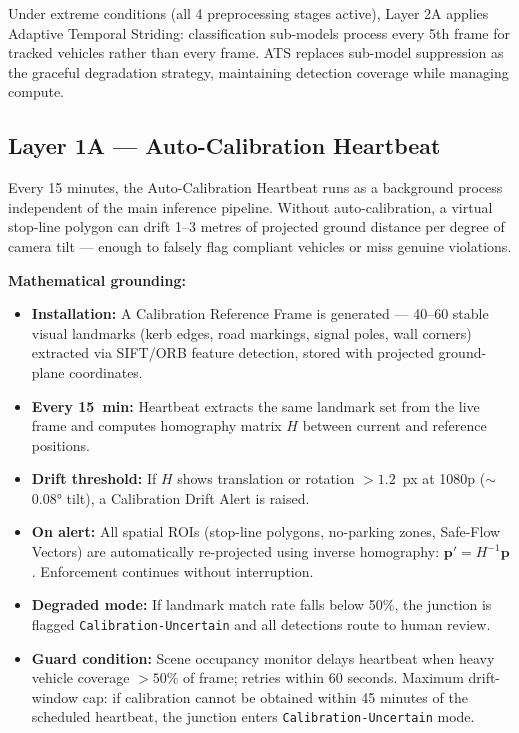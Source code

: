 \documentclass[11pt,a4paper]{article}
\begin{document}
Under extreme conditions (all 4 preprocessing stages active), Layer 2A applies Adaptive Temporal Striding: classification sub-models process every 5th frame for tracked vehicles rather than every frame. ATS replaces sub-model suppression as the graceful degradation strategy, maintaining detection coverage while managing compute.

\subsection*{Layer 1A — Auto-Calibration Heartbeat}

Every 15 minutes, the Auto-Calibration Heartbeat runs as a background process independent of the main inference pipeline. Without auto-calibration, a virtual stop-line polygon can drift 1--3 metres of projected ground distance per degree of camera tilt — enough to falsely flag compliant vehicles or miss genuine violations.

\textbf{Mathematical grounding:}
\begin{itemize}[leftmargin=1.8em, itemsep=0.2em]
    \item \textbf{Installation:} A Calibration Reference Frame is generated — 40--60 stable visual landmarks (kerb edges, road markings, signal poles, wall corners) extracted via SIFT/ORB feature detection, stored with projected ground-plane coordinates.
    \item \textbf{Every 15~min:} Heartbeat extracts the same landmark set from the live frame and computes homography matrix $H$ between current and reference positions.
    \item \textbf{Drift threshold:} If $H$ shows translation or rotation $> 1.2$~px at 1080p ($\sim$0.08° tilt), a Calibration Drift Alert is raised.
    \item \textbf{On alert:} All spatial ROIs (stop-line polygons, no-parking zones, Safe-Flow Vectors) are automatically re-projected using inverse homography: $\mathbf{p}' = H^{-1}\mathbf{p}$. Enforcement continues without interruption.
    \item \textbf{Degraded mode:} If landmark match rate falls below 50\%, the junction is flagged \texttt{Calibration-Uncertain} and all detections route to human review.
    \item \textbf{Guard condition:} Scene occupancy monitor delays heartbeat when heavy vehicle coverage $> 50\%$ of frame; retries within 60 seconds. Maximum drift-window cap: if calibration cannot be obtained within 45 minutes of the scheduled heartbeat, the junction enters \texttt{Calibration-Uncertain} mode.
\end{itemize}
\end{document}
